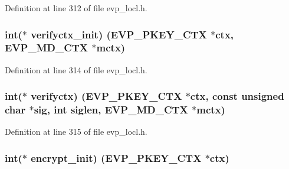 Definition at line 312 of file evp\+\_\+locl.\+h.

\subsubsection[{\texorpdfstring{verifyctx\+\_\+init}{verifyctx_init}}]{\setlength{\rightskip}{0pt plus 5cm}int($\ast$ verifyctx\+\_\+init) ({\bf E\+V\+P\+\_\+\+P\+K\+E\+Y\+\_\+\+C\+TX} $\ast$ctx, {\bf E\+V\+P\+\_\+\+M\+D\+\_\+\+C\+TX} $\ast$mctx)}\hypertarget{structevp__pkey__method__st_a277350e824db5ffd5a10273c8db72ffb}{}\label{structevp__pkey__method__st_a277350e824db5ffd5a10273c8db72ffb}


Definition at line 314 of file evp\+\_\+locl.\+h.

\subsubsection[{\texorpdfstring{verifyctx}{verifyctx}}]{\setlength{\rightskip}{0pt plus 5cm}int($\ast$ verifyctx) ({\bf E\+V\+P\+\_\+\+P\+K\+E\+Y\+\_\+\+C\+TX} $\ast$ctx, const unsigned char $\ast$sig, int siglen, {\bf E\+V\+P\+\_\+\+M\+D\+\_\+\+C\+TX} $\ast$mctx)}\hypertarget{structevp__pkey__method__st_a68e71568cd40f21082766ab049ebb382}{}\label{structevp__pkey__method__st_a68e71568cd40f21082766ab049ebb382}


Definition at line 315 of file evp\+\_\+locl.\+h.

\subsubsection[{\texorpdfstring{encrypt\+\_\+init}{encrypt_init}}]{\setlength{\rightskip}{0pt plus 5cm}int($\ast$ encrypt\+\_\+init) ({\bf E\+V\+P\+\_\+\+P\+K\+E\+Y\+\_\+\+C\+TX} $\ast$ctx)}\hypertarget{structevp__pkey__method__st_a8f5011cb6740b5370a11b80b4a929f88}{}\label{structevp__pkey__method__st_a8f5011cb6740b5370a11b80b4a929f88}


